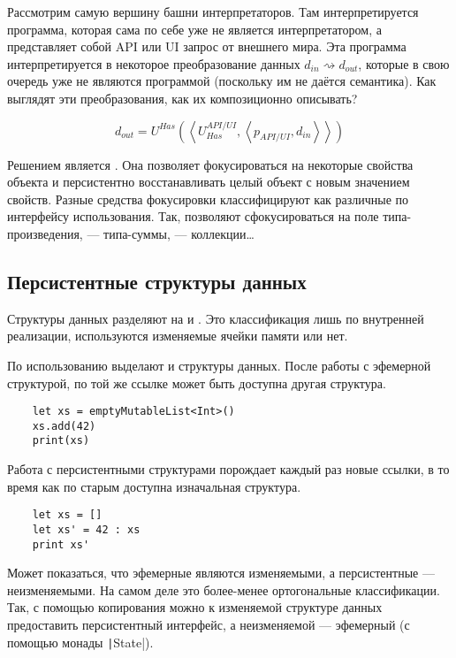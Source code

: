 
Рассмотрим самую вершину башни интерпретаторов.
Там интерпретируется программа, которая сама по себе уже не является интерпретатором, а представляет собой API или UI запрос от внешнего мира.
Эта программа интерпретируется в некоторое преобразование данных $d_{in}\rightsquigarrow d_{out}$, которые в свою очередь уже не являются программой (поскольку им не даётся семантика).
Как выглядят эти преобразования, как их композиционно описывать?

\[
    d_{out} =
    U^{Has}\left(
    \left<
    U_{Has}^{API/UI},
    \left<
    p_{API/UI},
    d_{in}
    \right>
    \right>
    \right)
\]

Решением является .
Она позволяет фокусироваться на некоторые свойства объекта и персистентно восстанавливать целый объект с новым значением свойств.
Разные средства фокусировки классифицируют как различные  по интерфейсу использования.
Так,  позволяют сфокусироваться на поле типа-произведения,  --- типа-суммы,  --- коллекции\ldots

\subsection{Персистентные структуры данных}

Структуры данных разделяют на  и .
Это классификация лишь по внутренней реализации, используются изменяемые ячейки памяти или нет.

По использованию выделают  и  структуры данных.
После работы с эфемерной структурой, по той же ссылке может быть доступна другая структура.
\begin{verbatim}
    let xs = emptyMutableList<Int>()
    xs.add(42)
    print(xs)
\end{verbatim}

Работа с персистентными структурами порождает каждый раз новые ссылки, в то время как по старым доступна изначальная структура.
\begin{verbatim}
    let xs = []
    let xs' = 42 : xs
    print xs'
\end{verbatim}

Может показаться, что эфемерные являются изменяемыми, а персистентные --- неизменяемыми.
На самом деле это более-менее ортогональные классификации.
Так, с помощью копирования можно к изменяемой структуре данных предоставить персистентный интерфейс, а неизменяемой --- эфемерный (с помощью монады \texttt|State|).

